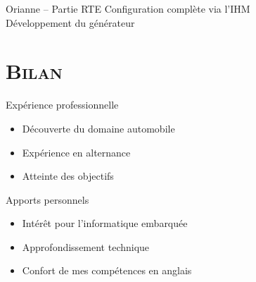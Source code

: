 \documentclass[xcolor=x11names,compress]{beamer}
\begin{document}
\begin{frame}{Orianne -- Partie RTE}
  \centering
  \vfill
  Configuration complète via l'IHM\\
  Développement du générateur
  \vfill
\end{frame}

\section{\scshape Bilan}
\begin{frame}{Expérience professionnelle}
  \vfill
  \begin{itemize}
	\item Découverte du domaine automobile
	\item Expérience en alternance
	\item Atteinte des objectifs
  \end{itemize}
  \vfill
\end{frame}

\begin{frame}{Apports personnels}
  \vfill
  \begin{itemize}
	\item Intérêt pour l'informatique embarquée
	\item Approfondissement technique
	\item Confort de mes compétences en anglais
  \end{itemize}
  \vfill
\end{frame}

\end{document}
